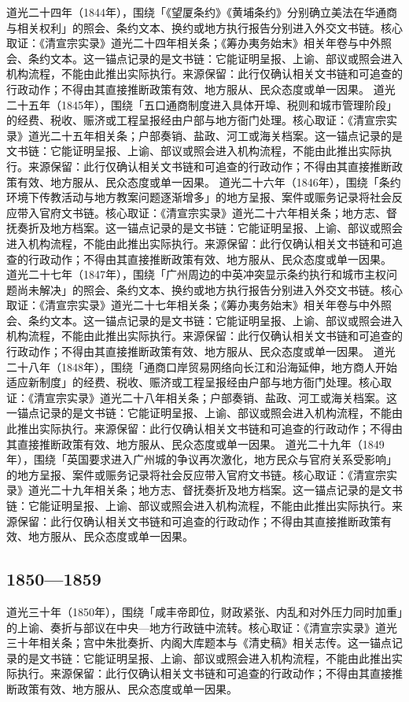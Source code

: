 道光二十四年（1844年），围绕「《望厦条约》《黄埔条约》分别确立美法在华通商与相关权利」的照会、条约文本、换约或地方执行报告分别进入外交文书链。核心取证：《清宣宗实录》道光二十四年相关条；《筹办夷务始末》相关年卷与中外照会、条约文本。这一锚点记录的是文书链：它能证明呈报、上谕、部议或照会进入机构流程，不能由此推出实际执行。来源保留：此行仅确认相关文书链和可追查的行政动作；不得由其直接推断政策有效、地方服从、民众态度或单一因果。
道光二十五年（1845年），围绕「五口通商制度进入具体开埠、税则和城市管理阶段」的经费、税收、赈济或工程呈报经由户部与地方衙门处理。核心取证：《清宣宗实录》道光二十五年相关条；户部奏销、盐政、河工或海关档案。这一锚点记录的是文书链：它能证明呈报、上谕、部议或照会进入机构流程，不能由此推出实际执行。来源保留：此行仅确认相关文书链和可追查的行政动作；不得由其直接推断政策有效、地方服从、民众态度或单一因果。
道光二十六年（1846年），围绕「条约环境下传教活动与地方教案问题逐渐增多」的地方呈报、案件或赈务记录将社会反应带入官府文书链。核心取证：《清宣宗实录》道光二十六年相关条；地方志、督抚奏折及地方档案。这一锚点记录的是文书链：它能证明呈报、上谕、部议或照会进入机构流程，不能由此推出实际执行。来源保留：此行仅确认相关文书链和可追查的行政动作；不得由其直接推断政策有效、地方服从、民众态度或单一因果。
道光二十七年（1847年），围绕「广州周边的中英冲突显示条约执行和城市主权问题尚未解决」的照会、条约文本、换约或地方执行报告分别进入外交文书链。核心取证：《清宣宗实录》道光二十七年相关条；《筹办夷务始末》相关年卷与中外照会、条约文本。这一锚点记录的是文书链：它能证明呈报、上谕、部议或照会进入机构流程，不能由此推出实际执行。来源保留：此行仅确认相关文书链和可追查的行政动作；不得由其直接推断政策有效、地方服从、民众态度或单一因果。
道光二十八年（1848年），围绕「通商口岸贸易网络向长江和沿海延伸，地方商人开始适应新制度」的经费、税收、赈济或工程呈报经由户部与地方衙门处理。核心取证：《清宣宗实录》道光二十八年相关条；户部奏销、盐政、河工或海关档案。这一锚点记录的是文书链：它能证明呈报、上谕、部议或照会进入机构流程，不能由此推出实际执行。来源保留：此行仅确认相关文书链和可追查的行政动作；不得由其直接推断政策有效、地方服从、民众态度或单一因果。
道光二十九年（1849年），围绕「英国要求进入广州城的争议再次激化，地方民众与官府关系受影响」的地方呈报、案件或赈务记录将社会反应带入官府文书链。核心取证：《清宣宗实录》道光二十九年相关条；地方志、督抚奏折及地方档案。这一锚点记录的是文书链：它能证明呈报、上谕、部议或照会进入机构流程，不能由此推出实际执行。来源保留：此行仅确认相关文书链和可追查的行政动作；不得由其直接推断政策有效、地方服从、民众态度或单一因果。
\subsection{1850—1859}
道光三十年（1850年），围绕「咸丰帝即位，财政紧张、内乱和对外压力同时加重」的上谕、奏折与部议在中央—地方行政链中流转。核心取证：《清宣宗实录》道光三十年相关条；宫中朱批奏折、内阁大库题本与《清史稿》相关志传。这一锚点记录的是文书链：它能证明呈报、上谕、部议或照会进入机构流程，不能由此推出实际执行。来源保留：此行仅确认相关文书链和可追查的行政动作；不得由其直接推断政策有效、地方服从、民众态度或单一因果。
